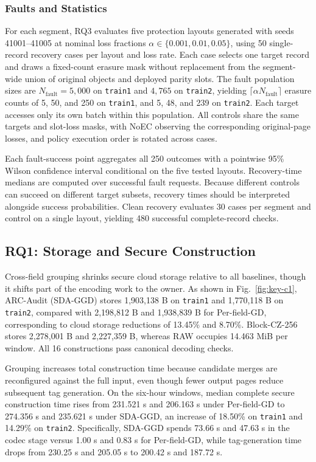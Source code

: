 \documentclass[10pt,journal]{IEEEtran}
\begin{document}
\subsubsection{Faults and Statistics}
For each segment, RQ3 evaluates five protection layouts generated with seeds 41001--41005 at nominal loss fractions $\alpha\in\{0.001,0.01,0.05\}$, using 50 single-record recovery cases per layout and loss rate. Each case selects one target record and draws a fixed-count erasure mask without replacement from the segment-wide union of original objects and deployed parity slots. The fault population sizes are $N_{\mathrm{fault}}=5{,}000$ on \texttt{train1} and $4{,}765$ on \texttt{train2}, yielding $\lceil\alpha N_{\mathrm{fault}}\rceil$ erasure counts of 5, 50, and 250 on \texttt{train1}, and 5, 48, and 239 on \texttt{train2}. Each target accesses only its own batch within this population. All controls share the same targets and slot-loss masks, with NoEC observing the corresponding original-page losses, and policy execution order is rotated across cases.

Each fault-success point aggregates all 250 outcomes with a pointwise 95\% Wilson confidence interval conditional on the five tested layouts. Recovery-time medians are computed over successful fault requests. Because different controls can succeed on different target subsets, recovery times should be interpreted alongside success probabilities. Clean recovery evaluates 30 cases per segment and control on a single layout, yielding 480 successful complete-record checks.



\subsection{RQ1: Storage and Secure Construction}
Cross-field grouping shrinks secure cloud storage relative to all baselines, though it shifts part of the encoding work to the owner. As shown in Fig.~\ref{fig:key-c1}, ARC-Audit (SDA-GGD) stores 1,903,138 B on \texttt{train1} and 1,770,118 B on \texttt{train2}, compared with 2,198,812 B and 1,938,839 B for Per-field-GD, corresponding to cloud storage reductions of 13.45\% and 8.70\%. Block-CZ-256 stores 2,278,001 B and 2,227,359 B, whereas RAW occupies 14.463 MiB per window. All 16 constructions pass canonical decoding checks.

Grouping increases total construction time because candidate merges are reconfigured against the full input, even though fewer output pages reduce subsequent tag generation. On the six-hour windows, median complete secure construction time rises from 231.521 s and 206.163 s under Per-field-GD to 274.356 s and 235.621 s under SDA-GGD, an increase of 18.50\% on \texttt{train1} and 14.29\% on \texttt{train2}. Specifically, SDA-GGD spends 73.66 s and 47.63 s in the codec stage versus 1.00 s and 0.83 s for Per-field-GD, while tag-generation time drops from 230.25 s and 205.05 s to 200.42 s and 187.72 s.
\end{document}

